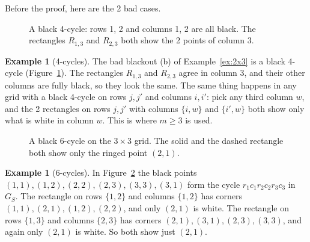 \documentclass[11pt]{article}
\theoremstyle{definition}
\newtheorem{example}[theorem]{Example}
\theoremstyle{remark}
\begin{document}
Before the proof, here are the 2 bad cases.

\begin{figure}[htbp]
\centering

\caption{A black 4-cycle: rows 1, 2 and columns 1, 2 are all black. The rectangles $R_{1,3}$ and
$R_{2,3}$ both show the 2 points of column 3.}
\label{fig:c4}
\end{figure}

\begin{example}[4-cycles]
The bad blackout (b) of Example~\ref{ex:2x3} is a black 4-cycle (Figure~\ref{fig:c4}). The
rectangles $R_{1,3}$ and $R_{2,3}$ agree in column 3, and their other columns are fully black,
so they look the same. The same thing happens in any grid with a black 4-cycle on rows $j,j'$
and columns $i,i'$: pick any third column $w$, and the 2 rectangles on rows $j,j'$ with columns
$\{i,w\}$ and $\{i',w\}$ both show only what is white in column $w$. This is where $m\ge3$ is
used.
\end{example}

\begin{figure}[htbp]
\centering

\caption{A black 6-cycle on the $3\times3$ grid. The solid and the dashed rectangle both show
only the ringed point $(2,1)$.}
\label{fig:c6}
\end{figure}

\begin{example}[6-cycles]
In Figure~\ref{fig:c6} the black points $(1,1),(1,2),(2,2),(2,3),(3,3),(3,1)$ form the cycle
$r_1c_1r_2c_2r_3c_3$ in $G_S$. The rectangle on rows $\{1,2\}$ and columns $\{1,2\}$ has corners
$(1,1),(2,1),(1,2),(2,2)$, and only $(2,1)$ is white. The rectangle on rows $\{1,3\}$ and columns
$\{2,3\}$ has corners $(2,1),(3,1),(2,3),(3,3)$, and again only $(2,1)$ is white. So both show
just $(2,1)$.
\end{example}
\end{document}
